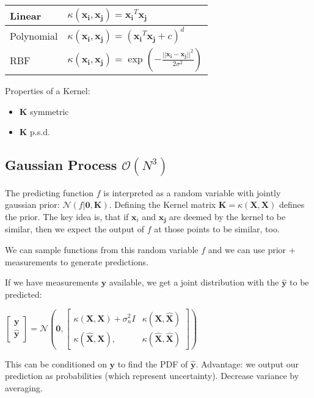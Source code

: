 \documentclass[10pt,a4paper,landscape]{article}
\renewcommand{\bf}[1]{\ensuremath{\mathbf{#1}}}
\newcommand{\psd}{p.s.d.}
\begin{document}
\begin{multicols*}{4}
\begin{tabular}{ l | l }
  \hline
  Linear     & $\kappa(\bf{x_i}, \bf{x_j}) = \bf{x_i}^T \bf{x_j}$ \\
  \hline
  Polynomial & $\kappa(\bf{x_i}, \bf{x_j}) = (\bf{x_i}^T \bf{x_j} + c)^d$ \\
  \hline
  RBF        & $\kappa(\bf{x_i}, \bf{x_j}) = \exp\left(-\frac{||\bf{x_i} - \bf{x_j}||^2}{2\sigma^2}\right)$ \\
  \hline
\end{tabular}

Properties of a Kernel:
\begin{itemize}
\item $\bf{K}$ symmetric%
\item $\bf{K}$ \psd%
\end{itemize}

\subsection{Gaussian Process \small$\mathcal{O}(N^3)$}
The predicting function $f$ is interpreted as a random variable with jointly gaussian prior: $\mathcal{N}(f | \bf{0}, \bf{K})$.
Defining the Kernel matrix $\bf{K} = \kappa(\bf{X}, \bf{X})$ defines the prior. The key idea is, that if $\bf{x}_i$ and $\bf{x_j}$ are
deemed by the kernel to be similar, then we expect the output of $f$ at those points to be similar, too.

We can sample functions from this random variable $f$ and we can use prior + measurements to generate predictions.

If we have measurements $\bf{y}$ available, we get a joint distribution with the $\bf{\hat{y}}$ to be predicted:

$
\begin{bmatrix}
  \bf{y} \\
  \bf{\hat{y}}
\end{bmatrix}
=
\mathcal{N} \left(
  \bf{0},
  \begin{bmatrix}
    \kappa(\bf{X}, \bf{X}) + \sigma_n^2 I  & \kappa(\bf{X}, \bf{\hat{X}}) \\
    \kappa(\bf{\hat{X}}, \bf{X}),          & \kappa(\bf{\hat{X}}, \bf{\hat{X}})
  \end{bmatrix}
\right)
$

This can be conditioned on $\bf{y}$ to find the PDF of $\bf{\hat{y}}$. Advantage: we output our prediction as probabilities (which represent uncertainty).
Decrease variance by averaging.


\end{multicols*}
\end{document}
